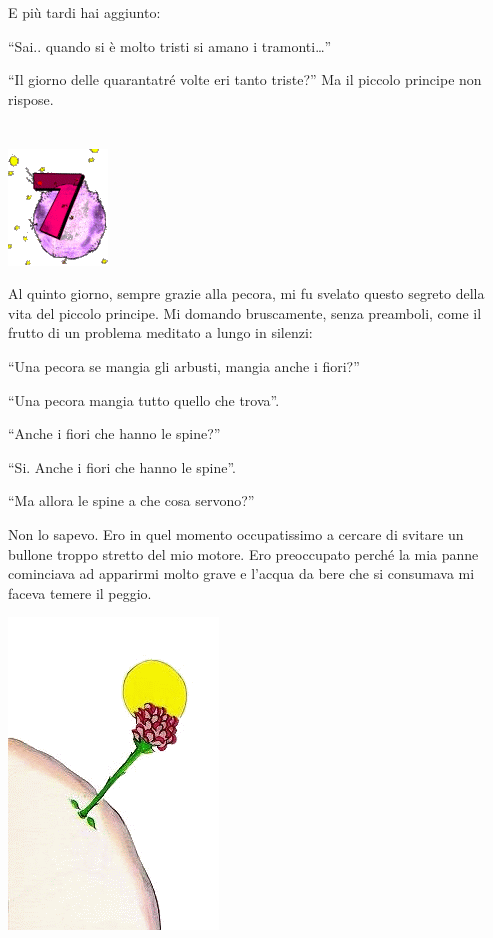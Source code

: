 \documentclass[11pt]{scrbook}
\begin{document}
E più tardi hai aggiunto:

``Sai.. quando si è molto tristi si amano i tramonti\ldots{}''

``Il giorno delle quarantatré volte eri tanto triste?'' Ma il piccolo principe non rispose.

\chapter{}
\begin{center}
\includegraphics{img/chapter7}
\end{center}

Al quinto giorno, sempre grazie alla pecora, mi fu svelato questo segreto della vita del piccolo principe. Mi domando bruscamente, senza preamboli, come il frutto di un problema meditato a lungo in silenzi:

``Una pecora se mangia gli arbusti, mangia anche i fiori?''

``Una pecora mangia tutto quello che trova''.

``Anche i fiori che hanno le spine?''

``Si. Anche i fiori che hanno le spine''.

``Ma allora le spine a che cosa servono?''

Non lo sapevo. Ero in quel momento occupatissimo a cercare di svitare un bullone troppo stretto del mio motore. Ero preoccupato perché la mia panne cominciava ad apparirmi molto grave e l'acqua da bere che si consumava mi faceva temere il peggio.

\begin{center}
\includegraphics{img/7a}

\end{center}
\end{document}

